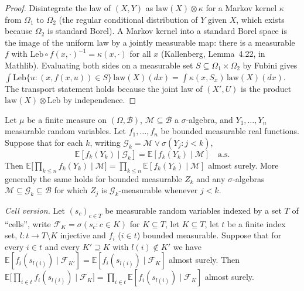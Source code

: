 \begin{proof}
  \leanok
Disintegrate the law of $(X,Y)$ as $\mathrm{law}(X)\otimes\kappa$ for a Markov kernel $\kappa$ from $\Omega_1$ to $\Omega_2$ (the regular conditional distribution of $Y$ given $X$, which exists because $\Omega_2$ is standard Borel). A
Markov kernel into a standard Borel space is the image of the uniform law by a jointly measurable map: there is a measurable $f$ with $\mathrm{Leb}\circ f(x,\cdot)^{-1}=\kappa(x,\cdot)$ for all $x$ (Kallenberg, Lemma~4.22, in Mathlib). Evaluating both
sides on a measurable set $S\subseteq\Omega_1\times\Omega_2$ by Fubini gives $\int\mathrm{Leb}\{u:(x,f(x,u))\in S\}\,\mathrm{law}(X)(dx)=\int\kappa(x,S_x)\,\mathrm{law}(X)(dx)$. The transport statement holds because the joint law of $(X',U)$ is the product
$\mathrm{law}(X)\otimes\mathrm{Leb}$ by independence.
\end{proof}

\begin{theorem}\label{thm:sg:seq-decoupling}
  \leanok
Let $\mu$ be a finite measure on $(\Omega,\mathscr B)$, $\mathscr M\subseteq\mathscr B$ a $\sigma$-algebra, and $Y_1,\dots,Y_n$ measurable random variables. Let $f_1,\dots,f_n$ be bounded measurable real functions. Suppose that
for each $k$, writing $\mathscr G_k=\mathscr M\vee\sigma(Y_j:j<k)$,
\[\mathbb E[f_k(Y_k)\mid\mathscr G_k]=\mathbb E[f_k(Y_k)\mid\mathscr M]\quad\text{a.s.}\]
Then $\mathbb E\big[\prod_{k\le n}f_k(Y_k)\mid\mathscr M\big]=\prod_{k\le n}\mathbb E[f_k(Y_k)\mid\mathscr M]$ almost surely. More generally the same holds for bounded measurable $Z_k$ and any
$\sigma$-algebras $\mathscr M\subseteq\mathscr G_k\subseteq\mathscr B$ for which $Z_j$ is $\mathscr G_k$-measurable whenever $j<k$.

\emph{Cell version.} Let $(s_c)_{c\in T}$ be measurable random variables indexed by a set $T$ of ``cells'', write $\mathscr F_K=\sigma(s_c:c\in K)$ for $K\subseteq T$, let $K\subseteq T$, let $t$ be a finite index set, $l:t\to T\setminus K$ injective and $f_i$ ($i\in t$) bounded measurable.
Suppose that for every $i\in t$ and every $K'\supseteq K$ with $l(i)\notin K'$ we have $\mathbb E[f_i(s_{l(i)})\mid\mathscr F_{K'}]=\mathbb E[f_i(s_{l(i)})\mid\mathscr F_K]$ almost surely. Then
$\mathbb E\big[\prod_{i\in t}f_i(s_{l(i)})\mid\mathscr F_K\big]=\prod_{i\in t}\mathbb E[f_i(s_{l(i)})\mid\mathscr F_K]$ almost surely.
\end{theorem}

